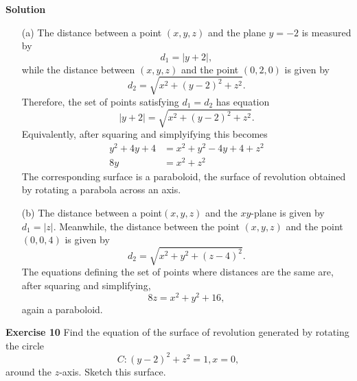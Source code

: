 \documentclass[12pt,oneside]{exam}
\newenvironment{exercise}[1]{\vspace{.1in}\noindent\textbf{Exercise #1 \hspace{.05em}}}{}
\newenvironment{newsolution}{\vspace{.1in}\noindent\textbf{Solution \hspace{.05em}}}{}
\begin{document}
\begin{newsolution}
\begin{itemize}
\item[(a)] The distance between a point $(x,y,z)$ and the plane $y=-2$ is measured by 
\begin{equation*}
d_1=|y+2|,
\end{equation*}
while the distance between $(x,y,z)$ and the point $(0,2,0)$ is given by
\begin{equation*}
d_2=\sqrt{x^2+(y-2)^2+z^2}.
\end{equation*}
Therefore, the set of points satisfying $d_1=d_2$ has equation
\begin{equation*}
|y+2| = \sqrt{x^2+(y-2)^2+z^2}.
\end{equation*}
Equivalently, after squaring and simplyifying this becomes 
\begin{align*}
y^2+4y+4 & =x^2+y^2-4y +4 +z^2 \\
8y & =x^2+z^2
\end{align*}
The corresponding surface is a paraboloid, the surface of revolution obtained by rotating a parabola across an axis. 
\item[(b)] The distance between a point$ (x,y,z)$ and the $xy$-plane is given by $d_1=|z|$. Meanwhile, the distance between the point $(x,y,z)$ and the point $(0,0,4)$ is given by 
\begin{equation*}
d_2=\sqrt{x^2+y^2+(z-4)^2}.
\end{equation*}
The equations defining the set of points where distances are the same are, after squaring and simplifying, 
\begin{equation*}
8z = x^2+y^2+16, 
\end{equation*}
again a paraboloid. 
\end{itemize}
\end{newsolution}

\begin{exercise}{10} 
Find the equation of the surface of revolution generated by rotating the circle 
\begin{equation*}
C \colon (y-2)^2 + z^2 = 1, x=0,
\end{equation*}
around the $z$-axis. Sketch this surface. 
\end{exercise}
\end{document}
